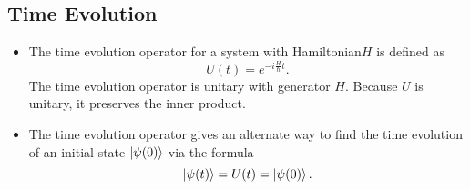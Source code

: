 \documentclass[11pt, a4paper]{article}
\newcommand{\Ham}{Hamiltonian\xspace}
\begin{document}
\subsection{Time Evolution} \label{ss:time-ev}
\begin{itemize}
    \item The time evolution operator for a system with \Ham $ H $ is defined as
    \begin{equation*}
        U(t) = e^{-i \frac{H}{\hbar}t}.
    \end{equation*}
    The time evolution operator is unitary with generator $ H $. Because $ U $ is unitary, it preserves the inner product.

    \item The time evolution operator gives an alternate way to find the time evolution of an initial state $ \ket{\psi(0)} $ via the formula
    \begin{equation*}
        \ket{\psi(t)} = U(t) = \ket{\psi(0)}.
    \end{equation*}
    
\end{itemize}
\end{document}
